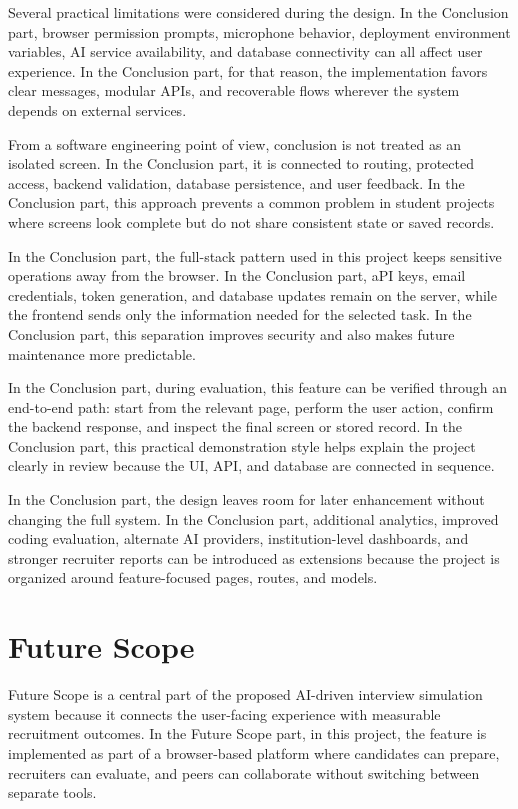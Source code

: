 \documentclass[12pt,a4paper]{report}
\begin{document}
Several practical limitations were considered during the design. In the Conclusion part, browser permission prompts, microphone behavior, deployment environment variables, AI service availability, and database connectivity can all affect user experience. In the Conclusion part, for that reason, the implementation favors clear messages, modular APIs, and recoverable flows wherever the system depends on external services.


From a software engineering point of view, conclusion is not treated as an isolated screen. In the Conclusion part, it is connected to routing, protected access, backend validation, database persistence, and user feedback. In the Conclusion part, this approach prevents a common problem in student projects where screens look complete but do not share consistent state or saved records.


In the Conclusion part, the full-stack pattern used in this project keeps sensitive operations away from the browser. In the Conclusion part, aPI keys, email credentials, token generation, and database updates remain on the server, while the frontend sends only the information needed for the selected task. In the Conclusion part, this separation improves security and also makes future maintenance more predictable.


In the Conclusion part, during evaluation, this feature can be verified through an end-to-end path: start from the relevant page, perform the user action, confirm the backend response, and inspect the final screen or stored record. In the Conclusion part, this practical demonstration style helps explain the project clearly in review because the UI, API, and database are connected in sequence.


In the Conclusion part, the design leaves room for later enhancement without changing the full system. In the Conclusion part, additional analytics, improved coding evaluation, alternate AI providers, institution-level dashboards, and stronger recruiter reports can be introduced as extensions because the project is organized around feature-focused pages, routes, and models.


\section{Future Scope}

Future Scope is a central part of the proposed AI-driven interview simulation system because it connects the user-facing experience with measurable recruitment outcomes. In the Future Scope part, in this project, the feature is implemented as part of a browser-based platform where candidates can prepare, recruiters can evaluate, and peers can collaborate without switching between separate tools.
\end{document}
